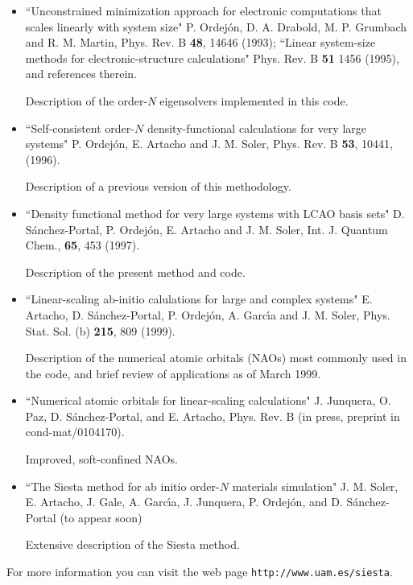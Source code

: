 \documentclass[11pt]{article}
\begin{document}
\begin{itemize}

\item
``Unconstrained minimization approach for electronic computations
that scales linearly with system size"
P. Ordej\'on, D. A. Drabold, M. P. Grumbach and R. M. Martin, 
Phys. Rev. B {\bf 48}, 14646 (1993); 
``Linear system-size methods for electronic-structure calculations"
Phys. Rev. B {\bf 51} 1456 (1995), and references therein.

Description of the order-{\it N} eigensolvers
implemented in this code.

\item
``Self-consistent order-$N$ density-functional 
calculations for very large systems"
P. Ordej\'on, E. Artacho and J. M. Soler,
Phys. Rev. B {\bf 53}, 10441, (1996).

Description of a previous version of this methodology.

\item
``Density functional method for very large systems with LCAO basis sets"
D. S\'anchez-Portal, P. Ordej\'on, E. Artacho and J. M. Soler,
Int. J. Quantum Chem., {\bf 65}, 453 (1997).

Description of the present method and code.

\item
``Linear-scaling ab-initio calulations for large and complex systems"
E. Artacho, D. S\'anchez-Portal, P. Ordej\'on, A. Garc\'{\i}a and
J. M. Soler, Phys. Stat. Sol. (b) {\bf 215}, 809 (1999).

Description of the numerical atomic orbitals (NAOs) most commonly 
used in the code, and brief review of applications as of March 1999.

\item
``Numerical atomic orbitals for linear-scaling calculations"
J. Junquera, O. Paz, D. S\'anchez-Portal, and E. Artacho, Phys. Rev. B
(in press, preprint in cond-mat/0104170). 

Improved, soft-confined NAOs.

\item
``The {\sc Siesta} method for ab initio order-$N$ materials simulation"
J. M. Soler, E. Artacho, J. Gale, A. Garc\'{\i}a, J. Junquera, P. Ordej\'on,
and D. S\'anchez-Portal (to appear soon)

Extensive description of the {\sc Siesta} method.

\end{itemize}

For more information you can visit the web page 
{\tt http://www.uam.es/siesta}.
\end{document}
